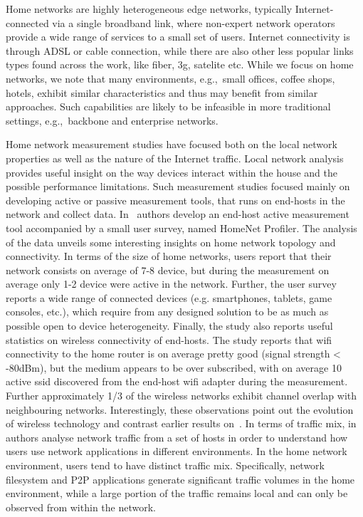 Home networks are highly heterogeneous edge networks, typically
Internet-connected via a single broadband link, where non-expert network
operators provide a wide range of services to a small set of users.  Internet
connectivity is through ADSL or cable connection, while there are also other
less popular links types found across the work, like fiber, 3g, satelite etc.
While we focus on home networks, we note that many environments, e.g.,~small
offices, coffee shops, hotels, exhibit similar characteristics and thus may
benefit from similar approaches. Such capabilities are likely to be infeasible
in more traditional settings, e.g.,~backbone and enterprise networks. 

Home network measurement studies have focused both on the local network
properties as well as the nature of the Internet traffic. Local network analysis
provides useful insight on the way devices interact within the house and the
possible performance limitations. Such measurement studies focused mainly on
developing active or passive measurement tools, that runs on end-hosts in the
network and collect data. In~\cite{homenetProfiler} authors develop an end-host
active  measurement tool accompanied by a small user survey, named HomeNet
Profiler. The analysis of the data unveils some interesting insights on home
network topology and connectivity. In terms of the size of home networks, users
report that their network consists on average of 7-8 device, but during the
measurement on average only 1-2 device were active in the network. Further, the
user survey reports a wide range of connected devices (e.g.  smartphones,
tablets, game consoles, etc.), which require from any designed solution to be as
much as possible open to device heterogeneity. Finally, the study also reports
useful statistics on wireless connectivity of end-hosts.  The study reports that
wifi connectivity to the home router is on average pretty good (signal strength
< -80dBm), but the medium appears to be over subscribed, with on average 10
active ssid discovered from the end-host wifi adapter during the measurement.
Further approximately 1/3 of the wireless networks exhibit channel overlap with
neighbouring networks. Interestingly, these observations point out the evolution
of wireless technology and contrast earlier results
on~\cite{Yarvis05characterizationof}. In terms of traffic mix,
in~\cite{Reggani12} authors analyse network traffic from a set of hosts in order
to understand how users use network applications in different environments. In
the home network environment, users tend to have distinct traffic mix.
Specifically, network filesystem and P2P applications generate significant
traffic volumes in the home environment, while a large portion of the traffic
remains local and can only be observed from within the network. 

